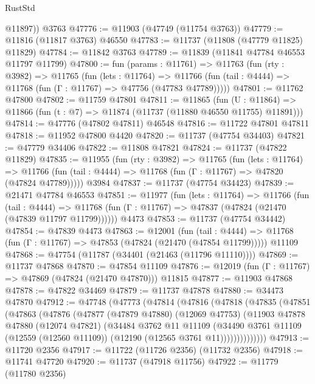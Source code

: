 \begin{lexlean}{RustStd}
\begin{coremodule}
        @11897))
    @3763
@47776 := @11903 (@47749 (@11754 @3763))
@47779 := @11816 (@11817 @3763) @46550
@47783 := @11737 (@11808 (@47779 @11825) @11829)
@47784 := @11842 @3763
@47789 := @11839 (@11841 @47784 @46553 @11797 @11799)
@47800 := fun (params : @11761) =>
  @11763
    (fun (rty : @3982) =>
    @11765
      (fun (lets : @11764) =>
      @11766 (fun (tail : @4444) => @11768 (fun (Γ : @11767) => @47756 (@47783 @47789)))))
@47801 := @11762 @47800
@47802 := @11759 @47801
@47811 := @11865
    (fun (U : @11864) => @11866 (fun (t : @7) => @11874 (@11737 (@11880 @46550 @11755) @11891)))
@47814 := @47776 (@47802 @47811) @46548
@47816 := @11722 @47801 @47811
@47818 := @11952 @47800 @4420
@47820 := @11737 (@47754 @34403)
@47821 := @47779 @34406
@47822 := @11808 @47821
@47824 := @11737 (@47822 @11829)
@47835 := @11955
    (fun (rty : @3982) =>
    @11765
      (fun (lets : @11764) =>
      @11766 (fun (tail : @4444) => @11768 (fun (Γ : @11767) => @47820 (@47824 @47789)))))
    @3984
@47837 := @11737 (@47754 @34423)
@47839 := @21471 @47784 @46553
@47851 := @11977
    (fun (lets : @11764) =>
    @11766
      (fun (tail : @4444) =>
      @11768 (fun (Γ : @11767) => @47837 (@47824 (@21470 (@47839 @11797 @11799))))))
    @4473
@47853 := @11737 (@47754 @34442)
@47854 := @47839 @4473
@47863 := @12001
    (fun (tail : @4444) => @11768 (fun (Γ : @11767) => @47853 (@47824 (@21470 (@47854 @11799)))))
    @11109
@47868 := @47754 (@11787 (@34401 (@21463 (@11796 @11110))))
@47869 := @11737 @47868
@47870 := @47854 @11109
@47876 := @12019 (fun (Γ : @11767) => @47869 (@47824 (@21470 @47870))) @11815
@47877 := @11903 @47868
@47878 := @47822 @34469
@47879 := @11737 @47878
@47880 := @34473 @47870
@47912 := @47748
    (@47773
      (@47814
        (@47816
          (@47818
            (@47835
              (@47851
                (@47863
                  (@47876
                    (@47877
                      (@47879 @47880)
                      (@12069 @47753)
                      (@11903
                        @47878
                        @47880
                        (@12074 @47821)
                        (@34484
                          @3762
                          @11
                          @11109
                          (@34490
                            @3761
                            @11109
                            (@12559 (@12560 @11109))
                            (@12190 (@12565 @3761 @11))))))))))))))
@47913 := @11720 @2356
@47917 := @11722 (@11726 @2356) (@11732 @2356)
@47918 := @11741 @47720
@47920 := @11737 (@47918 @11756)
@47922 := @11779 (@11780 @2356)

\end{coremodule}
\end{lexlean}
